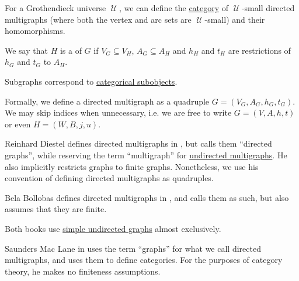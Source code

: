 \begin{definition}
\begin{thmenum}[resume=def:directed_multigraph]
     For a Grothendieck universe \( \mscrU \), we can define the \hyperref[def:category]{category} of \( \mscrU \)-small directed multigraphs (where both the vertex and arc sets are \( \mscrU \)-small) and their homomorphisms.

     We say that \( H \) is a  of \( G \) if \( V_G \subseteq V_H \), \( A_G \subseteq A_H \) and \( h_H \) and \( t_H \) are restrictions of \( h_G \) and \( t_G \) to \( A_H \).

    Subgraphs correspond to \hyperref[def:subobject_and_quotient]{categorical subobjects}.
  \end{thmenum}
\end{definition}
\begin{comments}
  \item Formally, we define a directed multigraph as a quadruple \( G = (V_G, A_G, h_G, t_G) \). We may skip indices when unnecessary, i.e. we are free to write \( G = (V, A, h, t) \) or even \( H = (W, B, j, u) \).

  \item Reinhard Diestel defines directed multigraphs in \cite[28]{Diestel2005}, but calls them \enquote{directed graphs}, while reserving the term \enquote{multigraph} for \hyperref[def:undirected_multigraph]{undirected multigraphs}. He also implicitly restricts graphs to finite graphs. Nonetheless, we use his convention of defining directed multigraphs as quadruples.

  Bela Bollobas defines directed multigraphs in \cite[8]{Bollobas1998}, and calls them as such, but also assumes that they are finite.

  Both books use \hyperref[def:undirected_graph]{simple undirected graphs} almost exclusively.

  Saunders Mac Lane in \cite[10]{MacLane1998} uses the term \enquote{graphs} for what we call directed multigraphs, and uses them to define categories. For the purposes of category theory, he makes no finiteness assumptions.
\end{comments}

